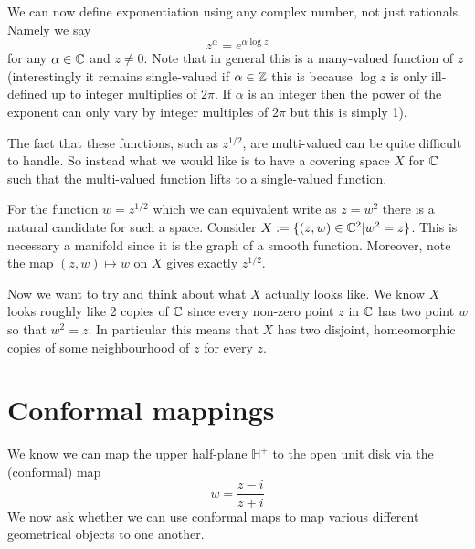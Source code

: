 We can now define exponentiation using any complex number, not just rationals. Namely we say
$$ z^\alpha = e^{\alpha \log z} $$
for any $\alpha \in \mathbb{C}$ and $z \neq 0$. Note that in general this is a many-valued function of $z$ (interestingly it remains single-valued if $\alpha \in \mathbb{Z}$ this is because $\log z$ is only ill-defined up to integer multiplies of $2\pi$. If $\alpha$ is an integer then the power of the exponent can only vary by integer multiples of $2\pi$ but this is simply 1). 

The fact that these functions, such as $z^{1/2}$, are multi-valued can be quite difficult to handle. So instead what we would like is to have a covering space $X$ for $\mathbb{C}$ such that the multi-valued function lifts to a single-valued function.

For the function $w = z^{1/2}$ which we can equivalent write as $z = w^2$ there is a natural candidate for such a space. Consider $X := \{(z, w) \in \mathbb{C}^2 | w^2 = z\}$. This is necessary a manifold since it is the graph of a smooth function. Moreover, note the map $(z, w) \mapsto w$ on $X$ gives exactly $z^{1/2}$.

Now we want to try and think about what $X$ actually looks like. We know $X$ looks roughly like 2 copies of $\mathbb{C}$ since every non-zero point $z$ in $\mathbb{C}$ has two point $w$ so that $w^2 = z$. In particular this means that $X$ has two disjoint, homeomorphic copies of some neighbourhood of $z$ for every $z$. 

\section{Conformal mappings}
We know we can map the upper half-plane $\mathbb{H}^+$ to the open unit disk via the (conformal) map
$$ w = \frac{z - i}{z + i} $$
We now ask whether we can use conformal maps to map various different geometrical objects to one another. 


